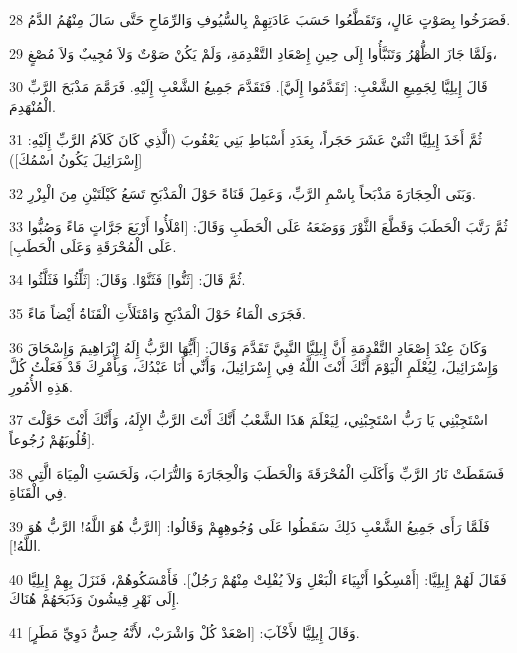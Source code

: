 \par 28 فَصَرَخُوا بِصَوْتٍ عَالٍ، وَتَقَطَّعُوا حَسَبَ عَادَتِهِمْ بِالسُّيُوفِ وَالرِّمَاحِ حَتَّى سَالَ مِنْهُمُ الدَّمُ.
\par 29 وَلَمَّا جَازَ الظُّهْرُ وَتَنَبَّأُوا إِلَى حِينِ إِصْعَادِ التَّقْدِمَةِ، وَلَمْ يَكُنْ صَوْتٌ وَلاَ مُجِيبٌ وَلاَ مُصْغٍ،
\par 30 قَالَ إِيلِيَّا لِجَمِيعِ الشَّعْبِ: [تَقَدَّمُوا إِلَيَّ]. فَتَقَدَّمَ جَمِيعُ الشَّعْبِ إِلَيْهِ. فَرَمَّمَ مَذْبَحَ الرَّبِّ الْمُنْهَدِمَ.
\par 31 ثُمَّ أَخَذَ إِيلِيَّا اثْنَيْ عَشَرَ حَجَراً، بِعَدَدِ أَسْبَاطِ بَنِي يَعْقُوبَ (الَّذِي كَانَ كَلاَمُ الرَّبِّ إِلَيْهِ: [إِسْرَائِيلَ يَكُونُ اسْمُكَ])
\par 32 وَبَنَى الْحِجَارَةَ مَذْبَحاً بِاسْمِ الرَّبِّ، وَعَمِلَ قَنَاةً حَوْلَ الْمَذْبَحِ تَسَعُ كَيْلَتَيْنِ مِنَ الْبِزْرِ.
\par 33 ثُمَّ رَتَّبَ الْحَطَبَ وَقَطَّعَ الثَّوْرَ وَوَضَعَهُ عَلَى الْحَطَبِ وَقَالَ: [امْلَأُوا أَرْبَعَ جَرَّاتٍ مَاءً وَصُبُّوا عَلَى الْمُحْرَقَةِ وَعَلَى الْحَطَبِ].
\par 34 ثُمَّ قَالَ: [ثَنُّوا] فَثَنَّوْا. وَقَالَ: [ثَلِّثُوا فَثَلَّثُوا.
\par 35 فَجَرَى الْمَاءُ حَوْلَ الْمَذْبَحِ وَامْتَلَأَتِ الْقَنَاةُ أَيْضاً مَاءً.
\par 36 وَكَانَ عِنْدَ إِصْعَادِ التَّقْدِمَةِ أَنَّ إِيلِيَّا النَّبِيَّ تَقَدَّمَ وَقَالَ: [أَيُّهَا الرَّبُّ إِلَهُ إِبْرَاهِيمَ وَإِسْحَاقَ وَإِسْرَائِيلَ، لِيُعْلَمِ الْيَوْمَ أَنَّكَ أَنْتَ اللَّهُ فِي إِسْرَائِيلَ، وَأَنِّي أَنَا عَبْدُكَ، وَبِأَمْرِكَ قَدْ فَعَلْتُ كُلَّ هَذِهِ الأُمُورِ.
\par 37 اسْتَجِبْنِي يَا رَبُّ اسْتَجِبْنِي، لِيَعْلَمَ هَذَا الشَّعْبُ أَنَّكَ أَنْتَ الرَّبُّ الإِلَهُ، وَأَنَّكَ أَنْتَ حَوَّلْتَ قُلُوبَهُمْ رُجُوعاً].
\par 38 فَسَقَطَتْ نَارُ الرَّبِّ وَأَكَلَتِ الْمُحْرَقَةَ وَالْحَطَبَ وَالْحِجَارَةَ وَالتُّرَابَ، وَلَحَسَتِ الْمِيَاهَ الَّتِي فِي الْقَنَاةِ.
\par 39 فَلَمَّا رَأَى جَمِيعُ الشَّعْبِ ذَلِكَ سَقَطُوا عَلَى وُجُوهِهِمْ وَقَالُوا: [الرَّبُّ هُوَ اللَّهُ! الرَّبُّ هُوَ اللَّهُ!].
\par 40 فَقَالَ لَهُمْ إِيلِيَّا: [أَمْسِكُوا أَنْبِيَاءَ الْبَعْلِ وَلاَ يُفْلِتْ مِنْهُمْ رَجُلٌ]. فَأَمْسَكُوهُمْ، فَنَزَلَ بِهِمْ إِيلِيَّا إِلَى نَهْرِ قِيشُونَ وَذَبَحَهُمْ هُنَاكَ.
\par 41 وَقَالَ إِيلِيَّا لأَخْآبَ: [اصْعَدْ كُلْ وَاشْرَبْ، لأَنَّهُ حِسُّ دَوِيِّ مَطَرٍ].
